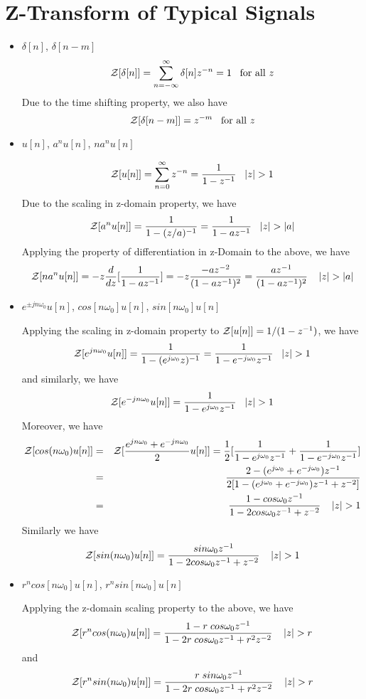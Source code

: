 \section*{Z-Transform of Typical Signals}
\begin{itemize}
\item $\delta[n]$, $\delta[n-m]$
\[	{\cal Z}[\delta[n]]=\sum_{n=-\infty}^\infty \delta[n]z^{-n}=1
	\;\;\;\mbox{for all $z$} \]
Due to the time shifting property, we also have
\[	{\cal Z}[\delta[n-m]]=z^{-m}\;\;\;\mbox{for all $z$} \]

\item $u[n]$, $a^n u[n]$, $n a^n u[n]$

\[	{\cal Z}[u[n]]=\sum_{n=0}^\infty z^{-n}=\frac{1}{1-z^{-1}}\;\;\;|z|>1 \]
Due to the scaling in z-domain property, we have
\[	{\cal Z}[a^nu[n]]=\frac{1}{1-(z/a)^{-1}}=\frac{1}{1-az^{-1}}\;\;\;|z|>|a| \]
Applying the property of differentiation in z-Domain to the above, we have
\[	{\cal Z}[na^nu[n]]=-z\frac{d}{dz}[\frac{1}{1-az^{-1}}]
	=-z\frac{-az^{-2}}{(1-az^{-1})^2}=\frac{az^{-1}}{(1-az^{-1})^2}
	\;\;\;\;|z|>|a|	\]

\item $e^{\pm jn\omega_0}u[n]$, $cos[n\omega_0]u[n]$, $sin[n\omega_0]u[n]$

Applying the scaling in z-domain property to ${\cal Z}[u[n]]=1/(1-z^{-1})$, we have
\[	{\cal Z}[e^{jn\omega_0}u[n]]=\frac{1}{1-(e^{j\omega_0}z)^{-1}}
	=\frac{1}{1-e^{-j\omega_0} z^{-1}}	\;\;\;|z|>1	\]
and similarly, we have
\[	{\cal Z}[e^{-jn\omega_0}u[n]]=\frac{1}{1-e^{j\omega_0} z^{-1}}\;\;\;|z|>1 \]
Moreover, we have
\begin{eqnarray}
{\cal Z}[cos(n\omega_0)u[n]]&=&{\cal Z}[\frac{e^{jn\omega_0}+e^{-jn\omega_0}}{2}u[n]]
=\frac{1}{2}[\frac{1}{1-e^{j\omega_0} z^{-1}}+\frac{1}{1-e^{-j\omega_0} z^{-1}}]
	\nonumber \\
&=&\frac{2-(e^{j\omega_0}+e^{-j\omega_0})z^{-1}}{2[1-(e^{j\omega_0}+e^{-j\omega_0})z^{-1}+z^{-2}]}
	\nonumber \\
&=& \frac{1-cos\omega_0 z^{-1}}{1-2cos\omega_0 z^{-1}+z^{-2}}\;\;\;\;|z|>1
	\nonumber
\end{eqnarray}
Similarly we have
\[	{\cal Z}[sin(n\omega_0)u[n]]=
\frac{sin\omega_0 z^{-1}}{1-2cos\omega_0 z^{-1}+z^{-2}}	\;\;\;\;|z|>1 \]

\item $r^n cos[n\omega_0]u[n]$, $r^n sin[n\omega_0]u[n]$

Applying the z-domain scaling property to the above, we have
\[	{\cal Z}[r^n cos(n\omega_0)u[n]]=
\frac{1-r\;cos\omega_0 z^{-1}}{1-2r\;cos\omega_0 z^{-1}+r^2 z^{-2}} \;\;\;\;|z|>r	\]
and
\[	{\cal Z}[r^n sin(n\omega_0)u[n]]=
\frac{r\;sin\omega_0 z^{-1}}{1-2r\;cos\omega_0 z^{-1}+r^2 z^{-2}} \;\;\;\;|z|>r	\]

\end{itemize}


